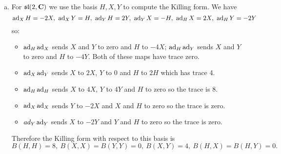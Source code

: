 \documentclass[12pt]{article}
\begin{document}
\begin{answer}
\begin{enumerate}[(a)]
\item For $\mathfrak{sl}(2,\mathbf{C})$ we use the basis $H,X,Y$ to compute the Killing form. We have
\[\ad_XH=-2X,\ \ad_XY=H,\ \ad_YH=2Y,\ \ad_YX=-H,\ \ad_HX=2X,\ \ad_HY=-2Y\]
so:
\begin{itemize}
\item $\operatorname{ad}_H\operatorname{ad}_X$ sends $X$ and $Y$ to zero and $H$ to $-4X$; $\operatorname{ad}_H\operatorname{ad}_Y$ sends $X$ and $Y$ to zero and $H$ to $-4Y$. Both of these maps have trace zero.
\item $\operatorname{ad}_X\operatorname{ad}_Y$ sends $X$ to $2X$, $Y$ to $0$ and $H$ to $2H$ which has trace 4.
\item $\operatorname{ad}_H\operatorname{ad}_H$ sends $X$ to $4X$, $Y$ to $4Y$ and $H$ to zero so the trace is 8.
\item $\operatorname{ad}_X\operatorname{ad}_X$ sends $Y$ to $-2X$ and $X$ and $H$ to zero so the trace is zero.
\item $ad_Y\operatorname{ad}_Y$ sends $X$ to $-2Y$ and $Y$ and $H$ to zero so the trace is zero.
\end{itemize}
Therefore the Killing form with respect to this basis is
\[B(H,H)=8,\ B(X,X)=B(Y,Y)=0,\ B(X,Y)=4,\ B(H,X)=B(H,Y)=0.\]
\end{enumerate}
\end{answer}
\end{document}
